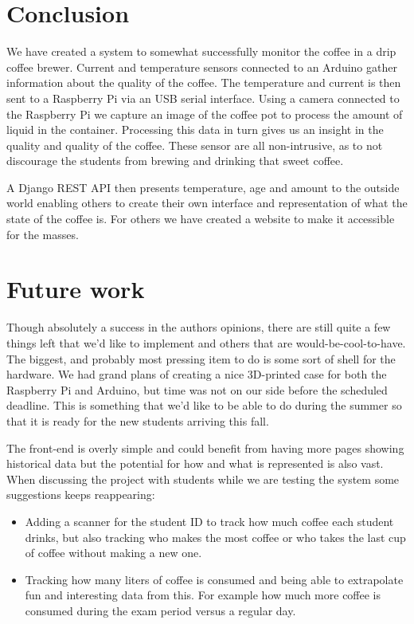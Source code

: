 \documentclass[12pt,a4paper,oneside,article]{memoir}
\numberwithin{equation}{chapter}
\begin{document}
\section{Conclusion}\label{sec:conclusion}
We have created a system to somewhat successfully monitor the coffee in a drip
coffee brewer. Current and temperature sensors connected to an Arduino gather
information about the quality of the coffee. The temperature and current is then
sent to a Raspberry Pi via an USB serial interface. Using a camera connected to
the Raspberry Pi we capture an image of the coffee pot to process the amount of
liquid in the container. Processing this data in turn gives us an insight in the
quality and quality of the coffee. These sensor are all non-intrusive, as to 
not discourage the students from brewing and drinking that sweet coffee.

A Django REST API then presents temperature, age and amount to the outside 
world enabling others to create their own interface and representation of what
the state of the coffee is. For others we have created a website to make it 
accessible for the masses.
 
\section{Future work}\label{sec:future-work}
Though absolutely a success in the authors opinions, there are still quite a few
things left that we'd like to implement and others that are
would-be-cool-to-have. The biggest, and probably most pressing item to do is
some sort of shell for the hardware. We had grand plans of creating a nice
3D-printed case for both the Raspberry Pi and Arduino, but time was not on our
side before the scheduled deadline. This is something that we'd like to be able
to do during the summer so that it is ready for the new students arriving this
fall.

The front-end is overly simple and could benefit from having more pages showing
historical data but the potential for how and what is represented is also vast.
When discussing the project with students while we are testing the system some
suggestions keeps reappearing:

\begin{itemize}
\item Adding a scanner for the student ID to track how much coffee each student
  drinks, but also tracking who makes the most coffee or who takes the last cup
  of coffee without making a new one.
\item Tracking how many liters of coffee is consumed and being able to
  extrapolate fun and interesting data from this. For example how much more
  coffee is consumed during the exam period versus a regular day.
\end{itemize}
\end{document}
